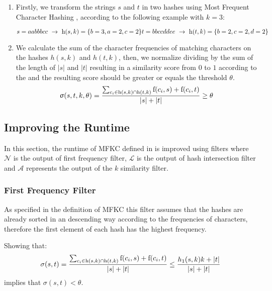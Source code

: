 \begin{enumerate}
	\item Firstly, we transform the strings $s$ and $t$ in two hashes using Most Frequent Character Hashing \cite{seker2014novel}, according to the following example with $k=3$:
	
	$s=aabbbcc \ \rightarrow \ \h{s,k}=\{b=3,a=2,c=2\} \\
	t=bbccddee \ \rightarrow \ \h{t,k}=\{b=2,c=2,d=2\}$
	
	\item We calculate the sum of the character frequencies of matching characters on the hashes $h(s,k)$ and $h(t,k)$, then, we normalize dividing by the sum of the length of $|s|$ and $|t|$ resulting in a similarity score from $0$ to $1$ according to the  and the resulting score should be greater or equals the threshold $\theta$.
	\begin{equation} \label{eq:d1}
		\upsigma(s,t,k,\theta) = \frac{\sum_{c_i \in \textnormal{h}(s,k) \cap \textnormal{h}(t,k)} \textnormal{f}(c_i,s)+\textnormal{f}(c_i,t)}{|s|+|t|} \geq \theta
	\end{equation}
	
\end{enumerate}

\subsection{Improving the Runtime}


In this section, the runtime of MFKC defined in  is improved using filters where $\mathcal{N}$ is the output of first frequency filter, $\mathcal{L}$ is the output of hash intersection filter and $\mathcal{A}$ represents the output of the $k$ similarity filter. 

\subsubsection{First Frequency Filter} \label{fff}

As specified in the definition of MFKC \cite{seker2014novel} this filter assumes that the hashes are already sorted in an descending way according to the frequencies of characters, therefore the first element of each hash has the highest frequency.

\begin{theorem} \label{thr:ff1}
Showing that:
\begin{equation} \label{eq:ff1}
	\sigma(s,t)= \frac
	{\sum_{c_i \in \textnormal{h}(s,k) \cap \textnormal{h}(t,k)} \textnormal{f}(c_i,s)+\textnormal{f}(c_i,t)}
	{|s|+|t|} \leq \frac{h_1(s,k) k + |t|}{|s| + |t|}
\end{equation}
implies that $\sigma(s,t) < \theta$.
\end{theorem}

